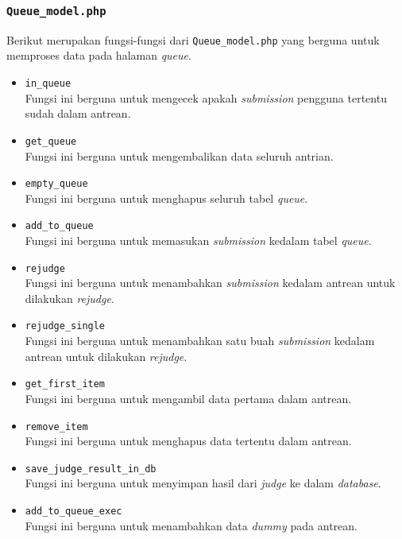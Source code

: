 \subsubsection{\texttt{Queue\_model.php}}
Berikut merupakan fungsi-fungsi dari \texttt{Queue\_model.php} yang berguna untuk memproses data pada halaman \textit{queue}.
\begin{itemize}
	\item \texttt{in\_queue}\\
	Fungsi ini berguna untuk mengecek apakah \textit{submission} pengguna tertentu sudah dalam antrean.
	\item \texttt{get\_queue}\\
	Fungsi ini berguna untuk mengembalikan data seluruh antrian.
	\item \texttt{empty\_queue}\\
	Fungsi ini berguna untuk menghapus seluruh tabel \textit{queue}.
	\item \texttt{add\_to\_queue}\\
	Fungsi ini berguna untuk memasukan \textit{submission} kedalam tabel \textit{queue}.
	\item \texttt{rejudge}\\
	Fungsi ini berguna untuk menambahkan \textit{submission} kedalam antrean untuk dilakukan \textit{rejudge}.
	\item \texttt{rejudge\_single}\\
	Fungsi ini berguna untuk menambahkan satu buah \textit{submission} kedalam antrean untuk dilakukan \textit{rejudge}.
	\item \texttt{get\_first\_item}\\
	Fungsi ini berguna untuk mengambil data pertama dalam antrean.
	\item \texttt{remove\_item}\\
	Fungsi ini berguna untuk menghapus data tertentu dalam antrean.
	\item \texttt{save\_judge\_result\_in\_db}\\
	Fungsi ini berguna untuk menyimpan hasil dari \textit{judge} ke dalam \textit{database}.
	\item \texttt{add\_to\_queue\_exec}\\
	Fungsi ini berguna untuk menambahkan data \textit{dummy} pada antrean.
\end{itemize}
